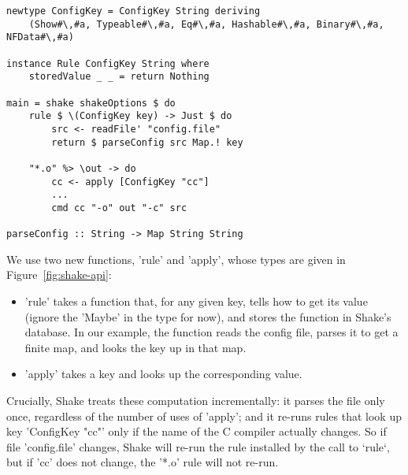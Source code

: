 \begin{lstlisting}
newtype ConfigKey = ConfigKey String deriving
    (Show#\,#a, Typeable#\,#a, Eq#\,#a, Hashable#\,#a, Binary#\,#a, NFData#\,#a)

instance Rule ConfigKey String where
    storedValue _ _ = return Nothing

main = shake shakeOptions $ do
    rule $ \(ConfigKey key) -> Just $ do
        src <- readFile' "config.file"
        return $ parseConfig src Map.! key

    "*.o" %> \out -> do
        cc <- apply [ConfigKey "cc"]
        ...
        cmd cc "-o" out "-c" src

parseConfig :: String -> Map String String
\end{lstlisting}
We use two new functions, \lst'rule' and \lst'apply', whose types are given in
Figure~\ref{fig:shake-api}:
\begin{itemize}
\item \lst'rule' takes a function that, for any given key, tells how to get its value
(ignore the \lst'Maybe' in the type for now), and stores the function in Shake's database.
In our example, the function reads the config file, parses it to get a finite map, and
looks the key up in that map.
\item \lst'apply' takes a key and looks up the corresponding value. 
\end{itemize}
Crucially, Shake treats these computation incrementally: it parses the
file only once, regardless of the number of uses of \lst'apply'; and
it re-runs rules that look up key \lst'ConfigKey "cc"' only if the
name of the C compiler actually changes.  So if file \lst'config.file' changes,
Shake will re-run the rule installed by the call to `rule`, but if \lst'cc' does
not change, the \lst'*.o' rule will not re-run.

% 

